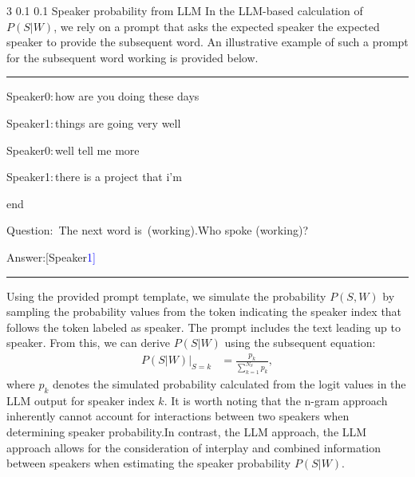 \documentclass{article}
\makeatletter
\newcommand{\blue}[1]{\textcolor{blue}{#1}}
\renewcommand{\subsubsection}{\@startsection
  {subsubsection}%
  {3}%
  {}%
  {0.1\baselineskip}%
  {0.1\baselineskip}%
  {}}%
\makeatother
\begin{document}
\subsubsection{Speaker probability from LLM}
In the LLM-based calculation of $P(S|W)$, we rely on a prompt that asks the expected speaker the expected speaker to provide the subsequent word. An illustrative example of such a prompt for the subsequent word {\ttfamily working} is provided below.
\vspace{-5px}
\noindent\rule{\linewidth}{0.8pt}
\begin{itemize}[label={},leftmargin=*,labelsep=0.0em,itemsep=0.01pt,partopsep=0.01pt]
\vspace{-1px}
{\scriptsize {\ttfamily
  \item \lbrack Speaker0\rbrack:\,how are you doing these days 
  \item \lbrack Speaker1\rbrack:\,things are going very well 
  \item \lbrack Speaker0\rbrack:\,well tell me more 
  \item \lbrack Speaker1\rbrack:\,there is a project that i'm 
  \item \lbrack end\rbrack \vspace{-1.0px}
  \item Question:~The next word is~(working).\;Who spoke (working)?  \vspace{-11.0px}
  \item Answer:[Speaker\blue{1]}}}
\vspace{-10px}
\end{itemize}
\noindent\rule{\linewidth}{0.8pt}
Using the provided prompt template, we simulate the probability $P(S, W)$ by sampling the probability values from the token indicating the speaker index that follows the token labeled as {\ttfamily speaker}. The prompt includes the text leading up to {\ttfamily speaker}. From this, we can derive $P(S|W)$ using the subsequent equation:
\begin{align}
P(S|W)\rvert_{S=k} &= \frac{p_k}{\sum_{k=1}^{N_S} p_{k}}  \label{eq:llm_spk_a1},
\end{align}
where $p_k$ denotes the simulated probability calculated from the logit values in the LLM output for speaker index $k$. It is worth noting that the n-gram approach inherently cannot account for interactions between two speakers when determining speaker probability.\;In contrast, the LLM approach, the LLM approach allows for the consideration of interplay and combined information between speakers when estimating the speaker probability $P(S|W)$.
\end{document}
